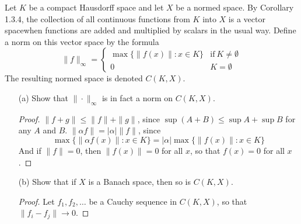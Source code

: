 \begin{exercise}
    Let $K$ be a compact Hausdorff space and let $X$ be a normed space. By Corollary 1.3.4, the collection of all continuous functions from $K$ into $X$ is a vector spacewhen functions are added and multiplied by scalars in the usual way. Define a norm on this vector space by the formula
    \[ \| f \|_\infty = \begin{cases} \max \{ \|f(x)\| : x \in K \} & \text{if}\ K \neq \emptyset \\ 0 & K = \emptyset \end{cases} \]
    The resulting normed space is denoted $C(K,X)$.
    \begin{enumerate}
        \item[(a)] Show that $\| \cdot \|_\infty$ is in fact a norm on $C(K,X)$.
        \begin{proof}
            $\| f + g \| \leq \| f \| + \| g \|$, since $\sup (A + B) \leq \sup A + \sup B$ for any $A$ and $B$. $\| \alpha f \| = |\alpha| \| f \|$, since
            \[ \max \{ \|\alpha f(x)\| : x \in K \} = |\alpha| \max \{ \|f(x)\| : x \in K \} \]
            And if $\| f \| = 0$, then $\|f(x)\| = 0$ for all $x$, so that $f(x) = 0$ for all $x$.
        \end{proof}

        \item[(b)] Show that if $X$ is a Banach space, then so is $C(K,X)$.
        \begin{proof}
            Let $f_1, f_2, \dots$ be a Cauchy sequence in $C(K,X)$, so that $\| f_i - f_j \| \to 0$.
        \end{proof}
    \end{enumerate}
\end{exercise}

